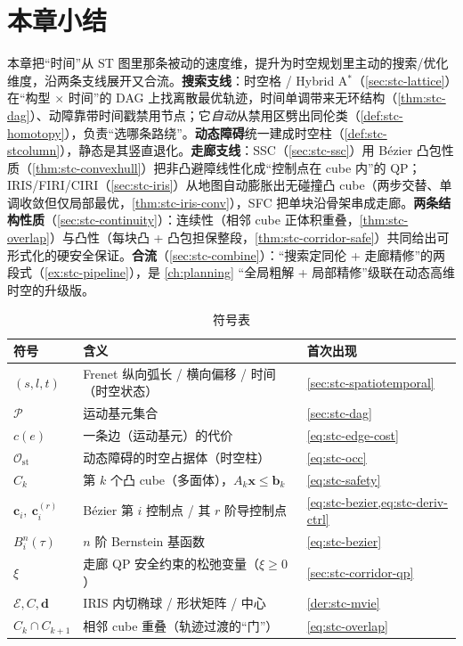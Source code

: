 \section*{本章小结}

本章把“时间”从 ST 图里那条被动的速度维，提升为时空规划里主动的搜索/优化维度，沿两条支线展开又合流。\textbf{搜索支线}：时空格 / Hybrid A$^*$（\cref{sec:stc-lattice}）在“构型 $\times$ 时间”的 DAG 上找离散最优轨迹，时间单调带来无环结构（\cref{thm:stc-dag}）、动障靠带时间戳禁用节点；它\emph{自动}从禁用区劈出同伦类（\cref{def:stc-homotopy}），负责“选哪条路绕”。\textbf{动态障碍}统一建成时空柱（\cref{def:stc-stcolumn}），静态是其竖直退化。\textbf{走廊支线}：SSC（\cref{sec:stc-ssc}）用 Bézier 凸包性质（\cref{thm:stc-convexhull}）把非凸避障线性化成“控制点在 cube 内”的 QP；IRIS/FIRI/CIRI（\cref{sec:stc-iris}）从地图自动膨胀出无碰撞凸 cube（两步交替、单调收敛但仅局部最优，\cref{thm:stc-iris-conv}），SFC 把单块沿骨架串成走廊。\textbf{两条结构性质}（\cref{sec:stc-continuity}）：连续性（相邻 cube 正体积重叠，\cref{thm:stc-overlap}）与凸性（每块凸 + 凸包担保整段，\cref{thm:stc-corridor-safe}）共同给出可形式化的硬安全保证。\textbf{合流}（\cref{sec:stc-combine}）：“搜索定同伦 + 走廊精修”的两段式（\cref{ex:stc-pipeline}），是 \cref{ch:planning} “全局粗解 + 局部精修”级联在动态高维时空的升级版。

\begin{table}[H]\centering\small
\caption{符号表}
\label{tab:stc-symbols}
\begin{tabular}{lll}
\toprule
符号 & 含义 & 首次出现 \\
\midrule
$(s,l,t)$ & Frenet 纵向弧长 / 横向偏移 / 时间（时空状态） & \cref{sec:stc-spatiotemporal} \\
$\mathcal{P}$ & 运动基元集合 & \cref{sec:stc-dag} \\
$c(e)$ & 一条边（运动基元）的代价 & \cref{eq:stc-edge-cost} \\
$\mathcal{O}_{\mathrm{st}}$ & 动态障碍的时空占据体（时空柱） & \cref{eq:stc-occ} \\
$C_k$ & 第 $k$ 个凸 cube（多面体），$A_k\mathbf{x}\le\mathbf{b}_k$ & \cref{eq:stc-safety} \\
$\mathbf{c}_i,\ \mathbf{c}_i^{(r)}$ & Bézier 第 $i$ 控制点 / 其 $r$ 阶导控制点 & \cref{eq:stc-bezier,eq:stc-deriv-ctrl} \\
$B_i^n(\tau)$ & $n$ 阶 Bernstein 基函数 & \cref{eq:stc-bezier} \\
$\xi$ & 走廊 QP 安全约束的松弛变量（$\xi\ge0$） & \cref{sec:stc-corridor-qp} \\
$\mathcal{E},C,\mathbf{d}$ & IRIS 内切椭球 / 形状矩阵 / 中心 & \cref{der:stc-mvie} \\
$C_k\cap C_{k+1}$ & 相邻 cube 重叠（轨迹过渡的“门”） & \cref{eq:stc-overlap} \\
\bottomrule
\end{tabular}
\end{table}

